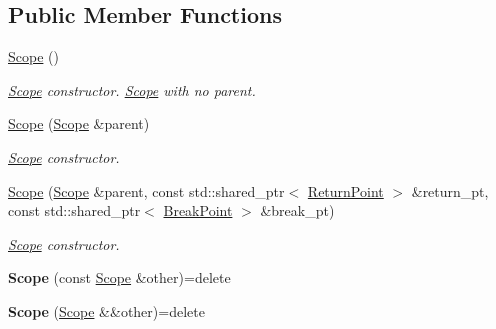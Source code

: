 \subsection*{Public Member Functions}
\begin{DoxyCompactItemize}
\item 
\hyperlink{classcreek_1_1_scope_a4aec0b36736b24d899f697bf2eed6709}{Scope} ()\hypertarget{classcreek_1_1_scope_a4aec0b36736b24d899f697bf2eed6709}{}\label{classcreek_1_1_scope_a4aec0b36736b24d899f697bf2eed6709}

\begin{DoxyCompactList}\small\item\em {\ttfamily \hyperlink{classcreek_1_1_scope}{Scope}} constructor. \hyperlink{classcreek_1_1_scope}{Scope} with no parent. \end{DoxyCompactList}\item 
\hyperlink{classcreek_1_1_scope_acfe9b0b583e5519ad1698d0ba526ee36}{Scope} (\hyperlink{classcreek_1_1_scope}{Scope} \&parent)
\begin{DoxyCompactList}\small\item\em {\ttfamily \hyperlink{classcreek_1_1_scope}{Scope}} constructor. \end{DoxyCompactList}\item 
\hyperlink{classcreek_1_1_scope_a156b545e4ac19a1ac5f91927e6976eb8}{Scope} (\hyperlink{classcreek_1_1_scope}{Scope} \&parent, const std\+::shared\+\_\+ptr$<$ \hyperlink{structcreek_1_1_scope_1_1_return_point}{Return\+Point} $>$ \&return\+\_\+pt, const std\+::shared\+\_\+ptr$<$ \hyperlink{structcreek_1_1_scope_1_1_break_point}{Break\+Point} $>$ \&break\+\_\+pt)
\begin{DoxyCompactList}\small\item\em {\ttfamily \hyperlink{classcreek_1_1_scope}{Scope}} constructor. \end{DoxyCompactList}\item 
{\bfseries Scope} (const \hyperlink{classcreek_1_1_scope}{Scope} \&other)=delete\hypertarget{classcreek_1_1_scope_aa5c07bfb9eb22953f30eb660c33d9fd1}{}\label{classcreek_1_1_scope_aa5c07bfb9eb22953f30eb660c33d9fd1}

\item 
{\bfseries Scope} (\hyperlink{classcreek_1_1_scope}{Scope} \&\&other)=delete\hypertarget{classcreek_1_1_scope_ad5c3e35aca190f2644363901e32c0253}{}\label{classcreek_1_1_scope_ad5c3e35aca190f2644363901e32c0253}


\end{DoxyCompactItemize}
